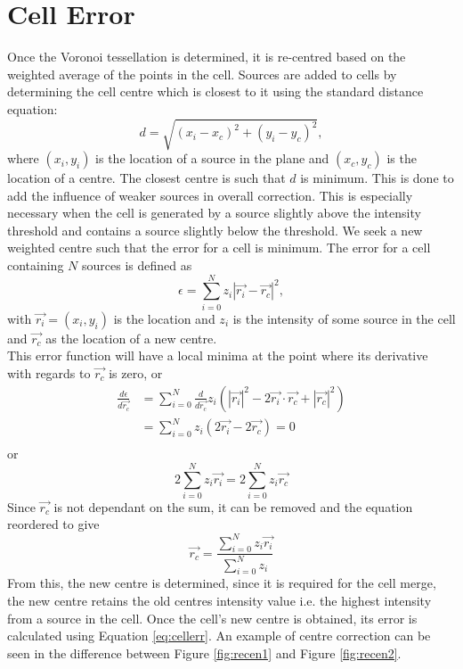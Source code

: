 \section{Cell Error}
Once the Voronoi tessellation is determined, it is re-centred based on the weighted average of the points in the cell. Sources are added to cells by determining the cell centre which is closest to it using the standard distance equation:
\begin{equation}
d = \sqrt{(x_i - x_c)^2 + (y_i - y_c)^2},
\end{equation}
where $(x_i,y_i)$ is the location of a source in the plane and $(x_c,y_c)$ is the location of a centre. The closest centre is such that $d$ is minimum. This is done to add the influence of weaker sources in overall correction. This is especially necessary when the cell is generated by a source slightly above the intensity threshold and contains a source slightly below the threshold. We seek a new weighted centre such that the error for a cell is minimum. The error for a cell containing $N$ sources is defined as
\begin{equation} \label{eq:cellerr}
	\epsilon = \sum^N_{i=0} z_i|\vec{r_i} - \vec{r_c}|^2,
\end{equation}
with $\vec{r_i} = (x_i,y_i)$ is the location and $z_i$ is the intensity of some source in the cell and $\vec{r_c}$ as the location of a new centre. 
\\
This error function will have a local minima at the point where its derivative with regards to $\vec{r_c}$ is zero, or
\begin{align*}
	\frac{d\epsilon}{d\vec{r_c}} &= \sum^N_{i=0} \frac{d}{d\vec{r_c}}z_i(|\vec{r_i}|^2 -2\vec{r_i}\cdot\vec{r_c} + |\vec{r_c}|^2) \\
	&= \sum^N_{i=0} z_i(2\vec{r_i} - 2\vec{r_c}) = 0 \\
\end{align*}
or
\begin{equation*}
	2\sum^N_{i=0} z_i\vec{r_i} = 2\sum^N_{i=0}z_i\vec{r_c}
\end{equation*}
Since $\vec{r_c}$ is not dependant on the sum, it can be removed and the equation reordered to give
\begin{equation}
	\vec{r_c} = \frac{\sum^N_{i=0} z_i\vec{r_i}}{\sum^N_{i=0}z_i}
\end{equation}
From this, the new centre is determined, since it is required for the cell merge, the new centre retains the old centres intensity value i.e. the highest intensity from a source in the cell. Once the cell's new centre is obtained, its error is calculated using Equation \ref{eq:cellerr}. An example of centre correction can be seen in the difference between Figure \ref{fig:recen1} and Figure \ref{fig:recen2}.
